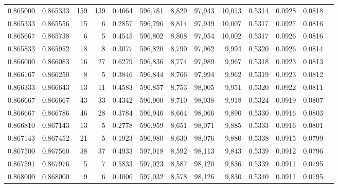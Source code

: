 \begin{tabular}{rrrrrrrrrrrrr}
0.865000 & 0.865333 &   159 & 139 &                                     0.4664 & 596,781 &   8,829 &  97,943 &  10,013 & 0.5314 & 0.0928 & 0.0818 \\
0.865333 & 0.865556 &    15 &   6 &                                     0.2857 & 596,796 &   8,814 &  97,949 &  10,007 & 0.5317 & 0.0927 & 0.0816 \\
0.865667 & 0.865738 &     6 &   5 &                                     0.4545 & 596,802 &   8,808 &  97,954 &  10,002 & 0.5317 & 0.0926 & 0.0816 \\
0.865833 & 0.865952 &    18 &   8 &                                     0.3077 & 596,820 &   8,790 &  97,962 &   9,994 & 0.5320 & 0.0926 & 0.0814 \\
0.866000 & 0.866083 &    16 &  27 &                                     0.6279 & 596,836 &   8,774 &  97,989 &   9,967 & 0.5318 & 0.0923 & 0.0813 \\
0.866167 & 0.866250 &     8 &   5 &                                     0.3846 & 596,844 &   8,766 &  97,994 &   9,962 & 0.5319 & 0.0923 & 0.0812 \\
0.866333 & 0.866643 &    13 &  11 &                                     0.4583 & 596,857 &   8,753 &  98,005 &   9,951 & 0.5320 & 0.0922 & 0.0811 \\
0.866667 & 0.866667 &    43 &  33 &                                     0.4342 & 596,900 &   8,710 &  98,038 &   9,918 & 0.5324 & 0.0919 & 0.0807 \\
0.866667 & 0.866786 &    46 &  28 &                                     0.3784 & 596,946 &   8,664 &  98,066 &   9,890 & 0.5330 & 0.0916 & 0.0803 \\
0.866810 & 0.867143 &    13 &   5 &                                     0.2778 & 596,959 &   8,651 &  98,071 &   9,885 & 0.5333 & 0.0916 & 0.0801 \\
0.867143 & 0.867452 &    21 &   5 &                                     0.1923 & 596,980 &   8,630 &  98,076 &   9,880 & 0.5338 & 0.0915 & 0.0799 \\
0.867500 & 0.867560 &    38 &  37 &                                     0.4933 & 597,018 &   8,592 &  98,113 &   9,843 & 0.5339 & 0.0912 & 0.0796 \\
0.867591 & 0.867976 &     5 &   7 &                                     0.5833 & 597,023 &   8,587 &  98,120 &   9,836 & 0.5339 & 0.0911 & 0.0795 \\
0.868000 & 0.868000 &     9 &   6 &                                     0.4000 & 597,032 &   8,578 &  98,126 &   9,830 & 0.5340 & 0.0911 & 0.0795 \\

\end{tabular}
